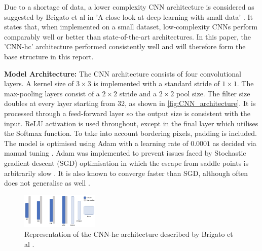 \documentclass[conference]{IEEEtran}
\begin{document}
Due to a shortage of data, a lower complexity CNN architecture is considered as suggested by Brigato et al in 'A close look at deep learning with small data' \cite{SmallData}. It states that, when implemented on a small dataset, low-complexity CNNs perform comparably well or better than state-of-the-art architectures. In this paper, the 'CNN-hc' architecture performed consistently well and will therefore form the base structure in this report.

\vspace{0.25cm}

\noindent \textbf{Model Architecture:} \newline
The CNN architecture consists of four convolutional layers. A kernel size of $3\times3$ is implemented with a standard stride of $1\times1$. The max-pooling layers consist of a $2\times2$ stride and a $2\times 2$ pool size. The filter size doubles at every layer starting from 32, as shown in \autoref{fig:CNN_architecture}. It is processed through a feed-forward layer so the output size is consistent with the input. ReLU activation is used throughout, except in the final layer which utilises the Softmax function. To take into account bordering pixels, padding is included. The model is optimised using Adam with a learning rate of $0.0001$ as decided via manual tuning \cite{ADAM}. Adam was implemented to prevent issues faced by Stochastic gradient descent (SGD) optimisation in which the escape from saddle points is arbitrarily slow \cite{DBLP:journals/corr/abs-2107-11774}. It is also known to converge faster than SGD, although often does not generalise as well \cite{SmallData, SGDvsADAM}.

\begin{figure}[H]
    \centering
    \includegraphics[width = 0.33\textwidth]{Figures/CNN_architecture.png}
    \caption{Representation of the CNN-hc architecture described by Brigato et al \cite{SmallData}.}
    \label{fig:CNN_architecture}
\end{figure}
\end{document}
